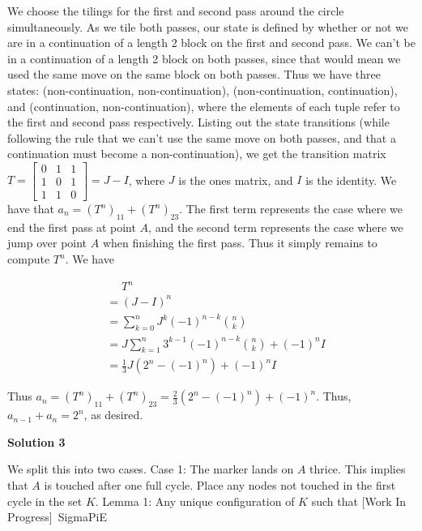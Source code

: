 \begin{enumerate}
We choose the tilings for the first and second pass around the circle simultaneously. As we tile both passes, our state is defined by whether or not we are in a continuation of a length 2 block on the first and second pass. We can't be in a continuation of a length 2 block on both passes, since that would mean we used the same move on the same block on both passes. Thus we have three states: (non-continuation, non-continuation), (non-continuation, continuation), and (continuation, non-continuation), where the elements of each tuple refer to the first and second pass respectively. Listing out the state transitions (while following the rule that we can't use the same move on both passes, and that a continuation must become a non-continuation), we get the transition matrix $T = \begin{bmatrix} 0 & 1 & 1 \\ 1 & 0 & 1 \\ 1 & 1 & 0 \end{bmatrix} = J-I$, where $J$ is the ones matrix, and $I$ is the identity. We have that $a_n = \left(T^n\right)_{11} + \left(T^n\right)_{23}$. The first term represents the case where we end the first pass at point $A$, and the second term represents the case where we jump over point $A$ when finishing the first pass. Thus it simply remains to compute $T^n$. We have

 \begin{align*}&\mathrel{\phantom{=}} T^n \\&= (J-I)^n \\&= \sum_{k=0}^n J^k (-1)^{n-k} {n \choose k} \\&= J \sum_{k=1}^n 3^{k-1} (-1)^{n-k} {n \choose k} + (-1)^n I \\&= \frac{1}{3}J\left(2^n-(-1)^n\right) + (-1)^n I\end{align*}


 Thus $a_n = \left(T^n\right)_{11} + \left(T^n\right)_{23} = \frac{2}{3}\left(2^n-(-1)^n\right) + (-1)^n$. Thus, $a_{n-1}+a_n = 2^n$, as desired.

 



\textbf{Solution 3}

We split this into two cases. Case 1: The marker lands on $A$ thrice. This implies that $A$ is touched after one full cycle. Place any nodes not touched in the first cycle in the set $K$. Lemma 1: Any unique configuration of $K$ such that [Work In Progress]~SigmaPiE

 



\end{enumerate}
